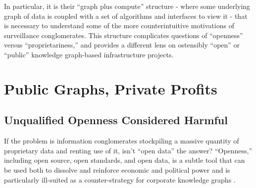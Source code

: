 In particular, it is their ``graph plus compute'' structure - where some
underlying graph of data is coupled with a set of algorithms and
interfaces to view it - that is necessary to understand some of the more
counterintuitive motivations of surveillance conglomerates. This
structure complicates questions of ``openness'' versus
``proprietariness,'' and provides a different lens on ostensibly
``open'' or ``public'' knowledge graph-based infrastructure projects.

\hypertarget{public-graphs-private-profits}{%
\section{Public Graphs, Private
Profits}\label{public-graphs-private-profits}}

\hypertarget{unqualified-openness-considered-harmful}{%
\subsection{Unqualified Openness Considered
Harmful}\label{unqualified-openness-considered-harmful}}

If the problem is information conglomerates stockpiling a massive
quantity of proprietary data and renting use of it, isn't ``open data''
the answer? ``Openness,'' including open source, open standards, and
open data, is a subtle tool that can be used both to dissolve and
reinforce economic and political power and is particularly ill-suited as
a counter-strategy for corporate knowledge graphs .

